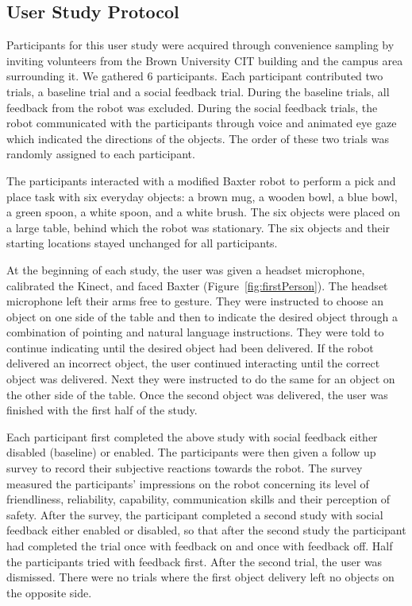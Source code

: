 \documentclass[letterpaper]{article}
\begin{document}
\subsection{User Study Protocol}
Participants for this user study were acquired through convenience sampling by
inviting volunteers from the Brown University CIT building and the campus area
surrounding it. We gathered 6 participants. Each participant
contributed two trials, a baseline trial and a social feedback trial. During
the baseline trials, all feedback from the robot was excluded. During the
social feedback trials, the robot communicated with the participants through
voice and animated eye gaze which indicated the directions of the objects. The
order of these two trials was randomly assigned to each participant.
 
The participants interacted with a modified Baxter robot to perform a pick
and place task with six everyday objects: a brown mug, a wooden bowl, a blue
bowl, a green spoon, a white spoon, and a white brush. The six objects were
placed on a large table, behind which the robot was stationary. The six
objects and their starting locations stayed unchanged for all participants.

At the beginning of each study, the user was given a headset microphone,
calibrated the Kinect, and faced Baxter (Figure~\ref{fig:firstPerson}). The
headset microphone left their arms free to gesture.  They were instructed to
choose an object on one side of the table and then to indicate the desired
object through a combination of pointing and natural language
instructions. They were told to continue indicating until the desired object had been 
delivered. If the robot delivered an incorrect object, the user continued
interacting until the correct object was delivered. Next they were instructed to
do the same for an object on the other side of the table. Once the second
object was delivered, the user was finished with the first half of the study. 

Each participant first completed the above study with social feedback either
disabled (baseline) or enabled.  The participants were then given a follow up
survey to record their subjective reactions towards the robot. The survey
measured the participants' impressions on the robot concerning its level
of friendliness, reliability, capability, communication skills and their
perception of safety.  After the survey, the participant completed a second
study with social feedback either enabled or disabled, so that after the
second study the participant had completed the trial once with feedback on and once with
feedback off. Half the participants tried with feedback first.  After the
second trial, the user was dismissed.  There were no trials where the first
object delivery left no objects on the opposite side.
\end{document}
